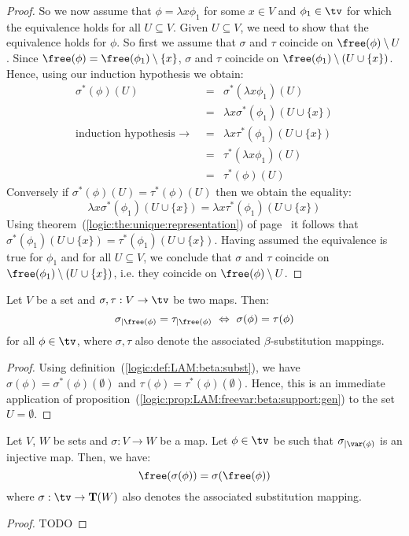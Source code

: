 \begin{proof}
    So we now assume that $\phi=\lambda x\phi_{1}$ for some $x\in V$ and
    $\phi_{1}\in\tv$ for which the equivalence holds for all $U\subseteq V$.
    Given $U\subseteq V$, we need to show that the equivalence holds for 
    $\phi$. So first we assume that $\sigma$ and $\tau$ coincide on
    $\free(\phi)\setminus U$. Since $\free(\phi)=\free(\phi_{1})\setminus\{x\}$,
    $\sigma$ and $\tau$ coincide on $\free(\phi_{1})\setminus (U\cup\{x\})$.
    Hence, using our induction hypothesis we obtain:
        \begin{eqnarray*}\sigma^{*}(\phi)(U)
            &=&\sigma^{*}(\lambda x\phi_{1})(U)\\
            &=&\lambda x\sigma^{*}(\phi_{1})(U\cup\{x\})\\
            \mbox{induction hypothesis\ $\rightarrow$\ }
            &=&\lambda x\tau^{*}(\phi_{1})(U\cup\{x\})\\
            &=&\tau^{*}(\lambda x \phi_{1})(U)\\
            &=&\tau^{*}(\phi)(U)
        \end{eqnarray*}
    Conversely if $\sigma^{*}(\phi)(U)=\tau^{*}(\phi)(U)$ then we obtain
    the equality:
        \[
            \lambda x\sigma^{*}(\phi_{1})(U\cup\{x\})
            =
            \lambda x\tau^{*}(\phi_{1})(U\cup\{x\})
        \]
    Using theorem~(\ref{logic:the:unique:representation}) of
    page~\pageref{logic:the:unique:representation} it follows that
    $\sigma^{*}(\phi_{1})(U\cup\{x\})=\tau^{*}(\phi_{1})(U\cup\{x\})$.
    Having assumed the equivalence is true for $\phi_{1}$ and for all 
    $U\subseteq V$, we conclude that $\sigma$ and $\tau$ coincide on
    $\free(\phi_{1})\setminus(U\cup\{x\})$, i.e. they coincide on
    $\free(\phi)\setminus U$.
\end{proof}

\begin{prop}\label{logic:prop:LAM:freevar:beta:support}
    Let $V$ be a set and $\sigma,\tau:V\to\tv$ be two maps. Then:
        \[
            \sigma_{|\free(\phi)}=\tau_{|\free(\phi)}
            \ \Leftrightarrow\ \sigma(\phi)=\tau(\phi)
        \]
    for all $\phi\in\tv$, where $\sigma,\tau$ also denote the associated
    $\beta$-substitution mappings.
\end{prop}
\begin{proof}
    Using definition~(\ref{logic:def:LAM:beta:subst}), we have 
    $\sigma(\phi)=\sigma^{*}(\phi)(\emptyset)$ and 
    $\tau(\phi)=\tau^{*}(\phi)(\emptyset)$. Hence, this is an immediate 
    application of proposition~(\ref{logic:prop:LAM:freevar:beta:support:gen}) 
    to the set $U=\emptyset$.
\end{proof}
\begin{prop}\label{logic:prop:LAM:freevar:of:substitution}
    Let $V$, $W$ be sets and $\sigma:V\to W$ be a map. Let $\phi\in\tv$ 
    be such that $\sigma_{|\var(\phi)}$ is an injective map. Then, we have:
    \[
        \free(\sigma(\phi))=\sigma(\free(\phi))
    \]
    where $\sigma:\tv\to{\bf T}(W)$ also denotes the associated substitution 
    mapping.
\end{prop}
\begin{proof}
TODO
\end{proof}

